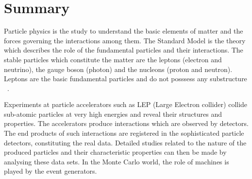 \chapter{Summary}
\label{Summary}
Particle physics is the study to understand the basic elements of matter and the forces governing the interactions among them. The Standard Model is the theory which describes the role of the fundamental particles and their interactions. The stable particles which constitute the matter are the leptons (electron and neutrino), the gauge boson (photon) and the nucleons (proton and neutron). Leptons are the basic fundamental particles and do not posssess any substructure ~\cite{per}.

Experiments at particle accelerators such as LEP (Large Electron collider) collide sub-atomic particles at very high energies and reveal their structures and properties. The accelerators produce interactions which are 
observed by detectors. The end products of such interactions are registered in the sophisticated particle detectors, constituting the real data. Detailed studies related to the nature of the produced particles and their characteristic properties can then be made by analysing these data sets. In the Monte Carlo world, the role of machines is played by the event generators. 

